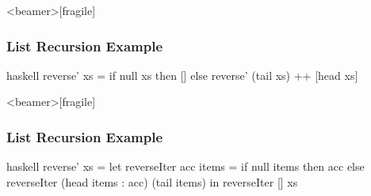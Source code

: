 \documentclass[dvipsnames]{beamer}
\theoremstyle{plain}
\begin{document}
\begin{frame}<beamer>[fragile]
  \frametitle{List Recursion Example}

  \begin{example}
    \begin{pygments}{haskell}
reverse' xs =
    if null xs
    then []
    else reverse' (tail xs) ++ [head xs]
    \end{pygments}
  \end{example}
\end{frame}

\begin{frame}<beamer>[fragile]
  \frametitle{List Recursion Example}

  \begin{example}
    \begin{pygments}{haskell}
reverse' xs =
    let
        reverseIter acc items =
            if null items
            then acc
            else reverseIter (head items : acc) (tail items)
    in
        reverseIter [] xs
    \end{pygments}
  \end{example}
\end{frame}
% 
% 
% 
\end{document}
